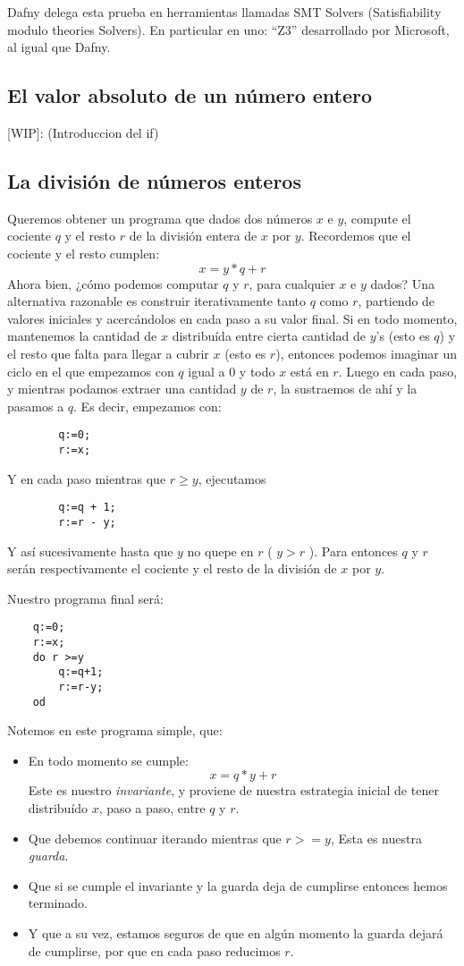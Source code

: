 \documentclass[12pt, a4paper, openany, fleqn]{book}
\begin{document}
    Dafny delega esta prueba en herramientas llamadas SMT Solvers (Satisfiability modulo theories Solvers). En particular en uno: ``Z3'' desarrollado por Microsoft, al igual que Dafny.

    \subsection{El valor absoluto de un número entero}
    [WIP]: (Introduccion del if)

    \subsection{La división de números enteros}
    Queremos obtener un programa que dados dos números $x$ e $y$, compute el cociente $q$ y el resto $r$ de la división entera de $x$ por $y$.
    Recordemos que el cociente y el resto cumplen:
    $$x = y * q + r$$
    Ahora bien, ¿cómo podemos computar $q$ y $r$, para cualquier $x$ e $y$ dados?
    Una alternativa razonable es construir iterativamente tanto $q$ como $r$, partiendo de valores iniciales y acercándolos en cada paso a su valor final.
    Si en todo momento, mantenemos la cantidad de $x$ distribuída entre cierta cantidad de $y$’s (esto es $q$) y el resto que falta para llegar a cubrir $x$ (esto es $r$), entonces podemos imaginar un ciclo en el que empezamos con $q$ igual a 0 y todo $x$ está en $r$.
    Luego en cada paso, y mientras podamos extraer una cantidad $y$ de $r$, la sustraemos de ahí y la pasamos a $q$.
    Es decir, empezamos con:
    \begin{verbatim}
        q:=0;
        r:=x;
    \end{verbatim}
    Y en cada paso mientras que $r \geq y$, ejecutamos
    \begin{verbatim}
        q:=q + 1;
        r:=r - y;
    \end{verbatim}

    Y así sucesivamente hasta que $y$ no quepe en $r$ ( $ y > r $ ). Para entonces $q$ y $r$ serán respectivamente el cociente y el resto de la división de $x$ por $y$.

    Nuestro programa final será:
    \begin{verbatim}
    q:=0;
    r:=x;
    do r >=y
        q:=q+1;
        r:=r-y;
    od
    \end{verbatim}
    Notemos en este programa simple, que:
    \begin{itemize}
        \item En todo momento se cumple:
        $$x = q * y + r$$
        Este es nuestro \textit{invariante}, y proviene de nuestra estrategia inicial de tener distribuído $x$, paso a paso, entre $q$ y $r$.
        \item Que debemos continuar iterando mientras que $r >= y$,
        Esta es nuestra \textit{guarda}.
        \item Que si se cumple el invariante y la guarda deja de cumplirse entonces hemos terminado.
        \item Y que a su vez, estamos seguros de que en algún momento la guarda dejará de cumplirse, por que en cada paso reducimos $r$.
    \end{itemize}
\end{document}
